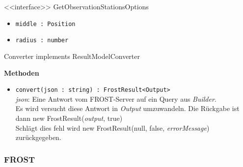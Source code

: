 \begin{Class}{<<interface>> GetObservationStationsOptions}
    \begin{itemize}
        \item \texttt{middle : Position}
        \item \texttt{radius : number}
    \end{itemize}
\end{Class}

\begin{Class}{Converter implements ResultModelConverter}

    \textbf{Methoden}
    \begin{itemize}
        \item \texttt{convert(json : string) : FrostResult<Output>}
        \\ \emph{json}: Eine Antwort vom FROST-Server auf ein Query aus \emph{Builder}.
        \\ Es wird versucht diese Antwort in \emph{Output} umzuwandeln.
        Die Rückgabe ist dann new FrostResult(\emph{output}, true)
        \\ Schlägt dies fehl wird new FrostResult(null, false, \emph{errorMessage}) zurückgegeben.
    \end{itemize}
\end{Class}

\iffalse
\subsubsection{FROST}


